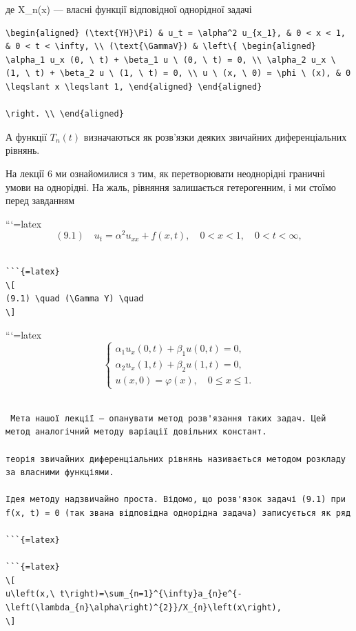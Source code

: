 \documentclass[
  ukrainian,
]{article}
\begin{document}
де X\_n\left(x\right) --- власні функції відповідної однорідної задачі

\begin{verbatim}
\begin{aligned} (\text{YH}\Pi) & u_t = \alpha^2 u_{x_1}, & 0 < x < 1, & 0 < t < \infty, \\ (\text{\GammaV}) & \left\{ \begin{aligned} \alpha_1 u_x (0, \ t) + \beta_1 u \ (0, \ t) = 0, \\ \alpha_2 u_x \ (1, \ t) + \beta_2 u \ (1, \ t) = 0, \\ u \ (x, \ 0) = \phi \ (x), & 0 \leqslant x \leqslant 1, \end{aligned} \end{aligned}

\right. \\ \end{aligned}
\end{verbatim}

А функції \(T_n(t)\) визначаються як розв'язки деяких звичайних
диференціальних рівнянь.

На лекції 6 ми ознайомилися з тим, як перетворювати неоднорідні граничні
умови на однорідні. На жаль, рівняння залишається гетерогенним, і ми
стоїмо перед завданням

```{=latex}
\[
(9.1) \quad u_{t} = \alpha^{2} u_{xx} + f(x, t), \quad 0 < x < 1, \quad 0 < t < \infty,
\]

\begin{verbatim}

```{=latex}
\[
(9.1) \quad (\Gamma Y) \quad
\]
\end{verbatim}

```{=latex}
\[
\begin{cases} \alpha_{1} u_{x}(0, t) + \beta_{1} u(0, t) = 0, \\ \alpha_{2} u_{x}(1, t) + \beta_{2} u(1, t) = 0, \\ u(x, 0) = \varphi(x), \quad 0 \le x \le 1. \end{cases}
\]

\begin{verbatim}

 Мета нашої лекції — опанувати метод розв'язання таких задач. Цей метод аналогічний методу варіації довільних констант.

теорія звичайних диференціальних рівнянь називається методом розкладу за власними функціями.

Ідея методу надзвичайно проста. Відомо, що розв'язок задачі (9.1) при f(x, t) = 0 (так звана відповідна однорідна задача) записується як ряд

```{=latex}

```{=latex}
\[
u\left(x,\ t\right)=\sum_{n=1}^{\infty}a_{n}e^{-\left(\lambda_{n}\alpha\right)^{2}}/X_{n}\left(x\right),
\]
\end{verbatim}
\end{document}
